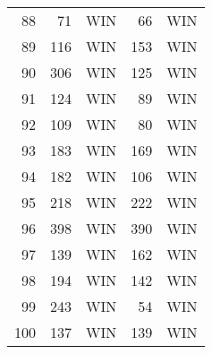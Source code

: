 \begin{tabular}{rrrrr}
        88 &         71 &        WIN &         66 &        WIN \\

        89 &        116 &        WIN &        153 &        WIN \\

        90 &        306 &        WIN &        125 &        WIN \\

        91 &        124 &        WIN &         89 &        WIN \\

        92 &        109 &        WIN &         80 &        WIN \\

        93 &        183 &        WIN &        169 &        WIN \\

        94 &        182 &        WIN &        106 &        WIN \\

        95 &        218 &        WIN &        222 &        WIN \\

        96 &        398 &        WIN &        390 &        WIN \\

        97 &        139 &        WIN &        162 &        WIN \\

        98 &        194 &        WIN &        142 &        WIN \\

        99 &        243 &        WIN &         54 &        WIN \\

       100 &        137 &        WIN &        139 &        WIN \\

\end{tabular}  
